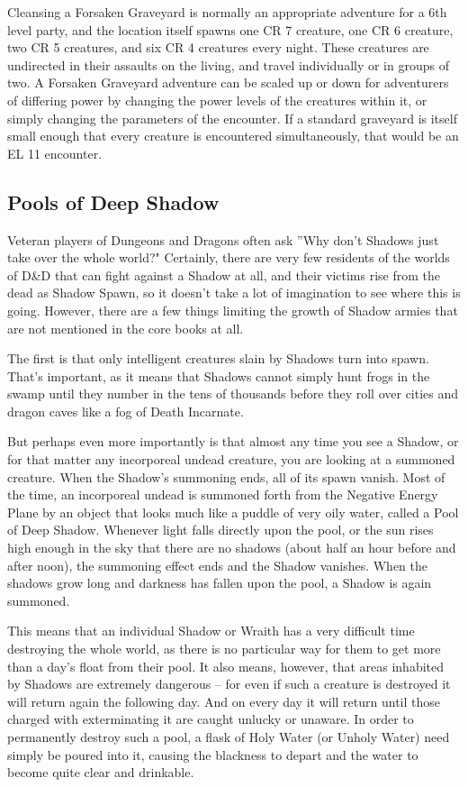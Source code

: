 Cleansing a Forsaken Graveyard is normally an appropriate adventure for a 6th level party, and the location itself spawns one CR 7 creature, one CR 6 creature, two CR 5 creatures, and six CR 4 creatures every night. These creatures are undirected in their assaults on the living, and travel individually or in groups of two. A Forsaken Graveyard adventure can be scaled up or down for adventurers of differing power by changing the power levels of the creatures within it, or simply changing the parameters of the encounter. If a standard graveyard is itself small enough that every creature is encountered simultaneously, that would be an EL 11 encounter.

\subsection{Pools of Deep Shadow}

Veteran players of Dungeons and Dragons often ask ''Why don't Shadows just take over the whole world?" Certainly, there are very few residents of the worlds of D\&D that can fight against a Shadow at all, and their victims rise from the dead as Shadow Spawn, so it doesn't take a lot of imagination to see where this is going. However, there are a few things limiting the growth of Shadow armies that are not mentioned in the core books at all.

The first is that only intelligent creatures slain by Shadows turn into spawn. That's important, as it means that Shadows cannot simply hunt frogs in the swamp until they number in the tens of thousands before they roll over cities and dragon caves like a fog of Death Incarnate.

But perhaps even more importantly is that almost any time you see a Shadow, or for that matter any incorporeal undead creature, you are looking at a summoned creature. When the Shadow's summoning ends, all of its spawn vanish. Most of the time, an incorporeal undead is summoned forth from the Negative Energy Plane by an object that looks much like a puddle of very oily water, called a Pool of Deep Shadow. Whenever light falls directly upon the pool, or the sun rises high enough in the sky that there are no shadows (about half an hour before and after noon), the summoning effect ends and the Shadow vanishes. When the shadows grow long and darkness has fallen upon the pool, a Shadow is again summoned.

This means that an individual Shadow or Wraith has a very difficult time destroying the whole world, as there is no particular way for them to get more than a day's float from their pool. It also means, however, that areas inhabited by Shadows are extremely dangerous -- for even if such a creature is destroyed it will return again the following day. And on every day it will return until those charged with exterminating it are caught unlucky or unaware. In order to permanently destroy such a pool, a flask of Holy Water (or Unholy Water) need simply be poured into it, causing the blackness to depart and the water to become quite clear and drinkable.

